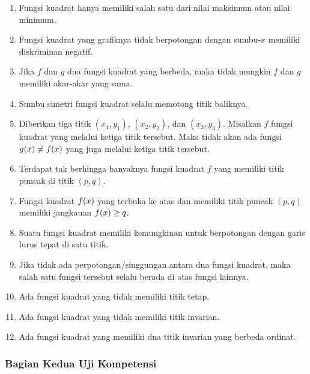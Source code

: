 \begin{enumerate}[topsep=0pt]
		\item Fungsi kuadrat hanya memiliki salah satu dari nilai maksimum atau nilai minimum.
		\item Fungsi kuadrat yang grafiknya tidak berpotongan dengan sumbu-$ x $ memiliki diskriminan negatif.
		\item Jika $ f $ dan $ g $ dua fungsi kuadrat yang berbeda, maka tidak mungkin $ f $ dan $ g $ memiliki akar-akar yang sama.
		\item Sumbu simetri fungsi kuadrat selalu memotong titik baliknya.
		\item Diberikan tiga titik $ \left(x_{1}, y_{1}\right) $, $ \left(x_{2}, y_{2}\right) $, dan $ \left(x_{3}, y_{3}\right) $. Misalkan $ f $ fungsi kuadrat yang melalui ketiga titik tersebut. Maka tidak akan ada fungsi $ \mathop{}\!{g}{\left({x}\right)} \ne \mathop{}\!{f}{\left({x}\right)} $ yang juga melalui ketiga titik tersebut.
		\item Terdapat tak berhingga banyaknya fungsi kuadrat $ f $ yang memiliki titik puncak di titik $ \left(p, q\right) $.
		\item Fungsi kuadrat $ \mathop{}\!{f}{\left({x}\right)} $ yang terbuka ke atas dan memiliki titik puncak $ \left(p, q\right) $ memiliki jangkauan $ \mathop{}\!{f}{\left({x}\right)} \geq q $.
		\item Suatu fungsi kuadrat memiliki kemungkinan untuk berpotongan dengan garis lurus tepat di satu titik.
		\item Jika tidak ada perpotongan/singgungan antara dua fungsi kuadrat, maka salah satu fungsi tersebut selalu berada di atas fungsi lainnya.
		\item Ada fungsi kuadrat yang tidak memiliki titik tetap.
		\item Ada fungsi kuadrat yang tidak memiliki titik invarian.
		\item Ada fungsi kuadrat yang memiliki dua titik invarian yang berbeda ordinat.
	\end{enumerate}

\subsubsection{Bagian Kedua \dashh Uji Kompetensi}
	
